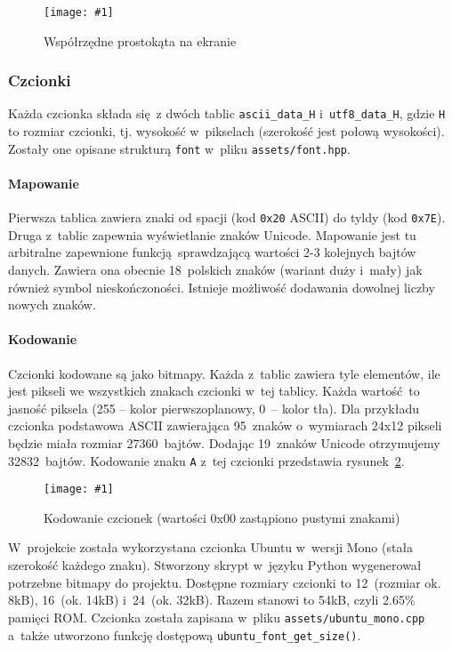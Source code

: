 \documentclass[polish]{aghengthesis}
\newcommand{\imgint}[4]{
	\begin{figure}[{#4}]
		\centering
		\texttt{[image: \#1]}
		\caption{#2}
		\label{#1}
	\end{figure}
}
\newcommand{\imgh}[3]{\imgint{#1}{#2}{#3}{H}}
\begin{document}
				\imgh{3/PicoRadio-screen-rect}{Współrzędne prostokąta na ekranie}{0.6}
			
			\subsubsection{Czcionki}
				Każda czcionka składa się z dwóch tablic \lstinline|ascii_data_H| i~\lstinline|utf8_data_H|, gdzie \lstinline|H| to rozmiar czcionki, tj. wysokość w~pikselach (szerokość jest połową wysokości). Zostały one opisane strukturą \lstinline|font| w~pliku \lstinline|assets/font.hpp|.
				
				\paragraph{Mapowanie}
					Pierwsza tablica zawiera znaki od spacji (kod \lstinline|0x20| ASCII) do tyldy (kod \lstinline|0x7E|). Druga z~tablic zapewnia wyświetlanie znaków Unicode. Mapowanie jest tu arbitralne zapewnione funkcją sprawdzającą wartości 2-3 kolejnych bajtów danych. Zawiera ona obecnie 18~polskich znaków (wariant duży i~mały) jak również symbol nieskończoności. Istnieje możliwość dodawania dowolnej liczby nowych znaków.
				
				\paragraph{Kodowanie}
					Czcionki kodowane są jako bitmapy. Każda z~tablic zawiera tyle elementów, ile jest pikseli we wszystkich znakach czcionki w~tej tablicy. Każda wartość to jasność piksela (255 -- kolor pierwszoplanowy, 0~-- kolor tła). Dla przykładu czcionka podstawowa ASCII zawierająca 95~znaków o~wymiarach 24x12 pikseli będzie miała rozmiar 27360~bajtów. Dodając 19~znaków Unicode otrzymujemy 32832~bajtów. Kodowanie znaku \lstinline|A| z~tej czcionki przedstawia rysunek~\ref{3/PicoRadio-screen-font}.
				
				\imgh{3/PicoRadio-screen-font}{Kodowanie czcionek (wartości 0x00 zastąpiono pustymi znakami)}{0.6}
				
				W~projekcie została wykorzystana czcionka Ubuntu\textsuperscript{\cite{ubuntu_font}} w~wersji Mono (stała szerokość każdego znaku). Stworzony skrypt w~języku Python wygenerował potrzebne bitmapy do projektu. Dostępne rozmiary czcionki to 12~(rozmiar ok. 8kB), 16~(ok. 14kB) i~24~(ok. 32kB). Razem stanowi to 54kB, czyli 2.65\% pamięci ROM. Czcionka została zapisana w~pliku \lstinline|assets/ubuntu_mono.cpp| a~także utworzono funkcję dostępową \lstinline|ubuntu_font_get_size()|. 
				
\end{document}
